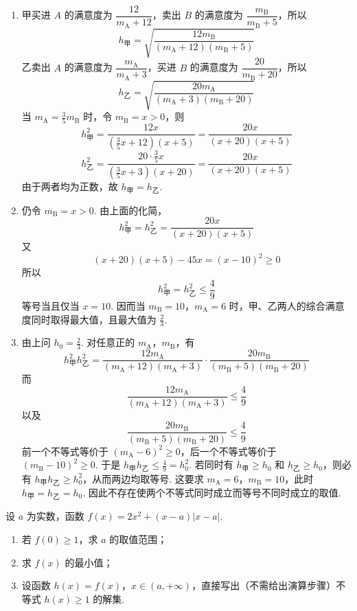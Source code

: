\begin{solution}
\begin{enumerate}
\item 甲买进 \(A\) 的满意度为 \(\dfrac{12}{m_{\text{A}}+12}\)，卖出 \(B\) 的满意度为 \(\dfrac{m_{\text{B}}}{m_{\text{B}}+5}\)，所以
\[
h_{\text{甲}}=\sqrt{\frac{12m_{\text{B}}}{(m_{\text{A}}+12)(m_{\text{B}}+5)}}
\]
乙卖出 \(A\) 的满意度为 \(\dfrac{m_{\text{A}}}{m_{\text{A}}+3}\)，买进 \(B\) 的满意度为 \(\dfrac{20}{m_{\text{B}}+20}\)，所以
\[
h_{\text{乙}}=\sqrt{\frac{20m_{\text{A}}}{(m_{\text{A}}+3)(m_{\text{B}}+20)}}
\]
当 \(m_{\text{A}}=\frac35m_{\text{B}}\) 时，令 \(m_{\text{B}}=x>0\)，则
\[
h_{\text{甲}}^2=\frac{12x}{\left(\frac35x+12\right)(x+5)}
=\frac{20x}{(x+20)(x+5)}
\]
\[
h_{\text{乙}}^2=\frac{20\cdot\frac35x}{\left(\frac35x+3\right)(x+20)}
=\frac{20x}{(x+20)(x+5)}
\]
由于两者均为正数，故 \(h_{\text{甲}}=h_{\text{乙}}\).

\item 仍令 \(m_{\text{B}}=x>0\). 由上面的化简，
\[
h_{\text{甲}}^2=h_{\text{乙}}^2=\frac{20x}{(x+20)(x+5)}
\]
又
\[
(x+20)(x+5)-45x=(x-10)^2\ge0
\]
所以
\[
h_{\text{甲}}^2=h_{\text{乙}}^2\le\frac49
\]
等号当且仅当 \(x=10\). 因而当 \(m_{\text{B}}=10\)，\(m_{\text{A}}=6\) 时，甲、乙两人的综合满意度同时取得最大值，且最大值为 \(\frac23\).

\item 由上问 \(h_0=\frac23\). 对任意正的 \(m_{\text{A}}\)，\(m_{\text{B}}\)，有
\[
h_{\text{甲}}^2h_{\text{乙}}^2
=\frac{12m_{\text{A}}}{(m_{\text{A}}+12)(m_{\text{A}}+3)}
\cdot
\frac{20m_{\text{B}}}{(m_{\text{B}}+5)(m_{\text{B}}+20)}
\]
而
\[
\frac{12m_{\text{A}}}{(m_{\text{A}}+12)(m_{\text{A}}+3)}\le\frac49
\]
以及
\[
\frac{20m_{\text{B}}}{(m_{\text{B}}+5)(m_{\text{B}}+20)}\le\frac49
\]
前一个不等式等价于 \((m_{\text{A}}-6)^2\ge0\)，后一个不等式等价于 \((m_{\text{B}}-10)^2\ge0\).
于是 \(h_{\text{甲}}h_{\text{乙}}\le\frac49=h_0^2\). 若同时有 \(h_{\text{甲}}\ge h_0\) 和 \(h_{\text{乙}}\ge h_0\)，则必有 \(h_{\text{甲}}h_{\text{乙}}\ge h_0^2\)，从而两边均取等号. 这要求 \(m_{\text{A}}=6\)，\(m_{\text{B}}=10\)，此时 \(h_{\text{甲}}=h_{\text{乙}}=h_0\). 因此不存在使两个不等式同时成立而等号不同时成立的取值.
\end{enumerate}
\end{solution}

\begin{problem}
设 \(a\) 为实数，函数 \(f(x)=2x^2+(x-a)|x-a|\).

\begin{enumerate}
\item 若 \(f(0)\ge1\)，求 \(a\) 的取值范围；
\item 求 \(f(x)\) 的最小值；
\item 设函数 \(h(x)=f(x)\)，\(x\in(a,+\infty)\)，直接写出（不需给出演算步骤）不等式 \(h(x)\ge1\) 的解集.
\end{enumerate}
\end{problem}

